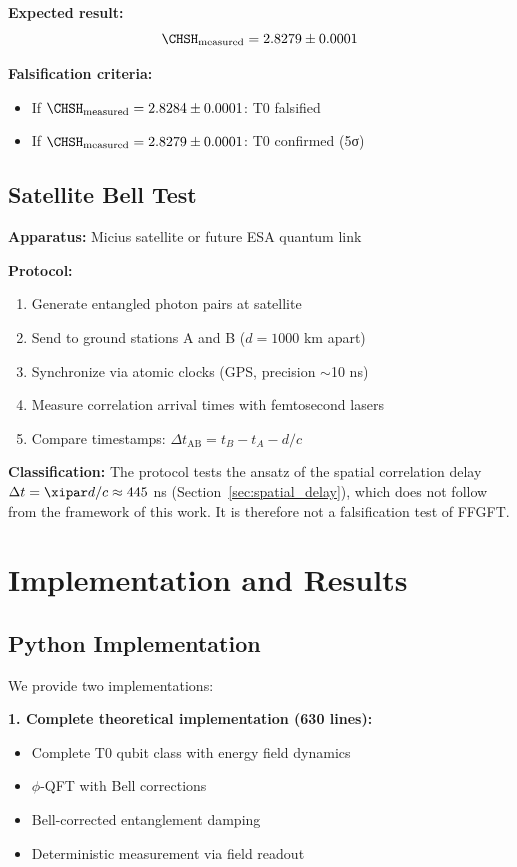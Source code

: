 \textbf{Expected result:}
\begin{equation}
	\CHSH_{\text{measured}} = 2.8279 \pm 0.0001
\end{equation}

\textbf{Falsification criteria:}
\begin{itemize}
	\item If $\CHSH_{\text{measured}} = 2.8284 \pm 0.0001$: T0 falsified
	\item If $\CHSH_{\text{measured}} = 2.8279 \pm 0.0001$: T0 confirmed (5σ)
\end{itemize}

\subsection{Satellite Bell Test}

\textbf{Apparatus:} Micius satellite or future ESA quantum link

\textbf{Protocol:}
\begin{enumerate}
	\item Generate entangled photon pairs at satellite
	\item Send to ground stations A and B ($d = 1000$ km apart)
	\item Synchronize via atomic clocks (GPS, precision $\sim$10 ns)
	\item Measure correlation arrival times with femtosecond lasers
	\item Compare timestamps: $\Delta t_{\text{AB}} = t_B - t_A - d/c$
\end{enumerate}

\textbf{Classification:} The protocol tests the ansatz of the spatial correlation delay $\Delta t = \xipar d/c \approx 445$ ns (Section~\ref{sec:spatial_delay}), which does not follow from the framework of this work. It is therefore not a falsification test of FFGFT.

\section{Implementation and Results}
\label{sec:implementation}

\subsection{Python Implementation}

We provide two implementations:

\textbf{1. Complete theoretical implementation (630 lines):}
\begin{itemize}
	\item Complete T0 qubit class with energy field dynamics
	\item $\phi$-QFT with Bell corrections
	\item Bell-corrected entanglement damping
	\item Deterministic measurement via field readout
\end{itemize}

